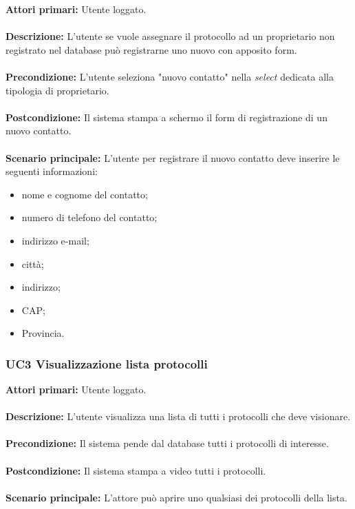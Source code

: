     \textbf{Attori primari:} Utente loggato.
    \\ 
    \\
    \textbf{Descrizione:} L'utente se vuole assegnare il protocollo ad un proprietario non registrato nel database può registrarne uno nuovo con apposito form.
    \\
    \\
    \textbf{Precondizione:} L'utente seleziona "nuovo contatto" nella \textit{select} dedicata alla tipologia di proprietario.
    \\
    \\
    \textbf{Postcondizione:} Il sistema stampa a schermo il form di registrazione di un nuovo contatto.
    \\
    \\
    \textbf{Scenario principale:} L'utente per registrare il nuovo contatto deve inserire le seguenti informazioni:
            \begin{itemize}
                \item nome e cognome del contatto;
                \item numero di telefono del contatto;
                \item indirizzo e-mail;
                \item città;
                \item indirizzo;
                \item CAP;
                \item Provincia.
            \end{itemize}

\subsubsection{UC3 Visualizzazione lista protocolli}
    \label{UC3}
    \textbf{Attori primari:} Utente loggato.
    \\
    \\
    \textbf{Descrizione:} L'utente visualizza una lista di tutti i protocolli che deve visionare.
    \\
    \\
    \textbf{Precondizione:} Il sistema pende dal database tutti i protocolli di interesse.
    \\
    \\
    \textbf{Postcondizione:} Il sistema stampa a video tutti i protocolli.
    \\
    \\
    \textbf{Scenario principale:} L'attore può aprire uno qualsiasi dei protocolli della lista.
    \newpage

